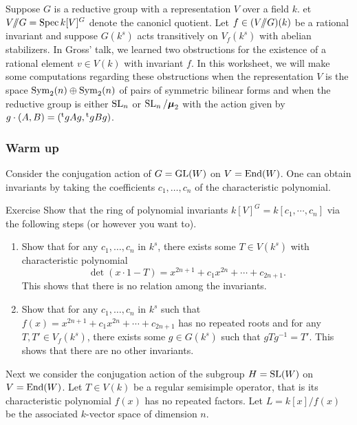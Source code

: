 Suppose $G$ is a reductive group with a representation $V$ over a field $k$. 
et $V/\!\!/ G=\operatorname{Spec} k[V]^G$ denote the canonicl quotient. Let 
$f\in (V/\!\!/ G)(k)$ be a rational invariant and suppose $G(k^s)$ acts 
transitively on $V_f(k^s)$ with abelian stabilizers. In Gross' talk, we 
learned two obstructions for the existence of a rational element $v\in V(k)$ 
with invariant $f$. In this worksheet, we will make some computations regarding 
these obstructions when the representation $V$ is the space 
$\operatorname{Sym}_2(n)\oplus\operatorname{Sym}_2(n)$ of pairs of symmetric bilinear forms and 
when the reductive group is either $\operatorname{SL}_n$ or 
$\operatorname{SL}_n/\boldsymbol\mu_2$ with the action given by 
$g\cdot (A,B)=(\prescript{\mathrm{t}}{}{g} A g, \prescript{\mathrm{t}}{}{g} B g)$. 


\subsubsection{Warm up}

Consider the conjugation action of $G=\operatorname{GL}(W)$ on $V=\operatorname{End}(W)$. One 
can obtain invariants by taking the coefficients $c_1,\dots,c_n$ of the 
characteristic polynomial. 

\begin{enonce*}[remark]{Exercise}
Show that the ring of polynomial invariants $k[V]^G=k[c_1,\cdots,c_n]$ via the 
following steps (or however you want to). 
\begin{enumerate}
  \item Show that for any $c_1,\dots,c_n$ in $k^s$, there exists some 
    $T\in V(k^s)$ with characteristic polynomial 
    \[
      \det(x\cdot 1-T) = x^{2n+1} + c_1 x^{2n} + \cdots + c_{2n+1} .
    \]
    This shows that there is no relation among the invariants. 
  \item Show that for any $c_1,\dots,c_n$ in $k^s$ such that 
    $f(x)=x^{2n+1} + c_1 x^{2n} + \cdots + c_{2n+1}$ has no repeated roots and 
    for any $T,T'\in V_f(k^s)$, there exists some $g\in G(k^s)$ such that 
    $g T g^{-1} = T'$. This shows that there are no other invariants. 
\end{enumerate}
\end{enonce*}

Next we consider the conjugation action of the subgroup $H=\operatorname{SL}(W)$ 
on $V=\operatorname{End}(W)$. Let $T\in V(k)$ be a regular semisimple operator, that is its 
characteristic polynomial $f(x)$ has no repeated factors. Let $L=k[x]/f(x)$ be 
the associated $k$-vector space of dimension $n$. 

